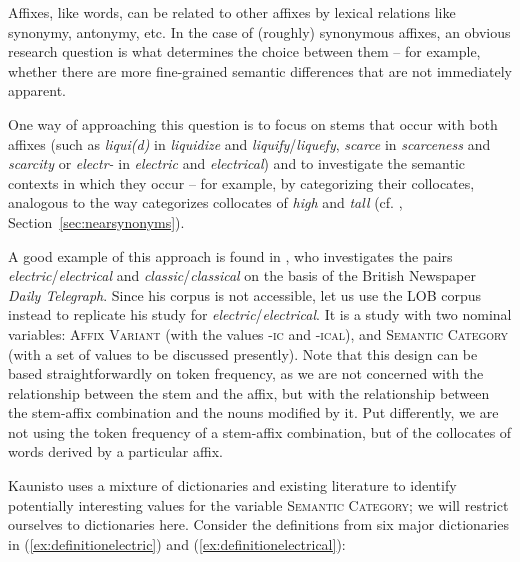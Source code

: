 Affixes, like words, can be related to other affixes  by lexical relations like synonymy,  antonymy,  etc. In the case of (roughly) synonymous affixes,  an obvious research question is what determines the choice between them -- for example, whether there are more fine\hyp{}grained semantic  differences that are not immediately apparent.

One way of approaching this question is to focus on stems  that occur with both affixes  (such as \textit{liqui(d)} in \textit{liquidize} and \textit{liquify}\slash \textit{liquefy}, \textit{scarce} in \textit{scarceness} and \textit{scarcity} or \textit{electr-} in \textit{electric} and \textit{electrical}) and to investigate the semantic  contexts in which they occur -- for example, by categorizing  their collocates,  analogous to the way \citet{taylor_near_2003} categorizes collocates of \textit{high} and \textit{tall} (cf. , Section~\ref{sec:nearsynonyms}).

A good example of this approach is found in \citet{kaunisto_electric/electrical_1999}, who investigates the pairs \textit{electric}\slash \textit{electrical} and \textit{classic}\slash \textit{classical} on the basis of the British Newspaper  \textit{Daily Telegraph}. Since his corpus is not accessible, let us use the LOB  corpus instead to replicate  his study for \textit{electric}\slash \textit{electrical}. It is a study with two nominal  variables: \textsc{Affix Variant} (with the values \textsc{-ic} and \textsc{-ical}), and \textsc{Semantic Category} (with a set of values to be discussed presently). Note that this design  can be based straightforwardly on token  frequency,  as we are not concerned with the relationship between the stem  and the affix,  but with the relationship between the stem\hyp{}affix combination and the nouns  modified by it. Put differently, we are not using the token  frequency of a stem\hyp{}affix combination, but of the collocates  of words derived by a particular  affix.

Kaunisto uses a mixture of dictionaries  and existing literature to identify potentially interesting values for the variable \textsc{Semantic Category}; we will restrict ourselves to dictionaries here. Consider the definitions from six major dictionaries  in (\ref{ex:definitionelectric}) and (\ref{ex:definitionelectrical}):

